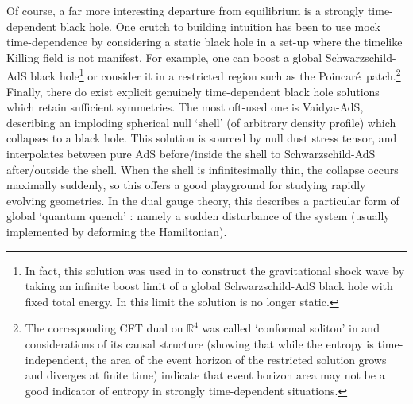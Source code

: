 \documentclass[12pt]{article}
\def\GT{gauge theory}
\def\Poinc{Poincar\' e}
\def\schw{Schwarzschild}
\def\RR{\mathbb{R}}
\begin{document}
Of course, a far more interesting departure from equilibrium is a strongly time-dependent black hole.  One crutch to building intuition has been to use mock time-dependence by considering a static black hole in a set-up where the timelike Killing field is not manifest.  For example, one can boost a global \schw-AdS black hole\footnote{
In fact, this solution was used in \cite{Horowitz:1999gf} to construct the gravitational shock wave by taking an infinite boost limit of a global \schw-AdS black hole with fixed total energy.  In this limit the solution is no longer static.
}
 or consider it in a restricted region such as the \Poinc\ patch.\footnote{
The corresponding CFT dual on $\RR^4$ was called `conformal soliton' in \cite{Friess:2006kw}
and considerations of its causal structure \cite{Figueras:2009iu} 
(showing that while the entropy is time-independent, the area of the event horizon of the restricted solution grows and diverges at finite time) indicate that event horizon area may not be a good indicator of entropy in strongly time-dependent situations.
}
Finally, there do exist explicit genuinely time-dependent black hole solutions which retain sufficient symmetries.  The most oft-used one is Vaidya-AdS, describing an imploding spherical null `shell' (of arbitrary density profile) which collapses to a black hole.  This solution is sourced by null dust stress tensor, and interpolates between pure AdS before/inside the shell to \schw-AdS after/outside the shell.  
When the shell is infinitesimally thin, the collapse occurs maximally suddenly, so this offers a good playground for studying rapidly evolving geometries.  In the dual \GT, this describes a particular form of global `quantum quench' \cite{Calabrese07}: namely a sudden disturbance of the system (usually implemented by deforming the Hamiltonian).
\end{document}
